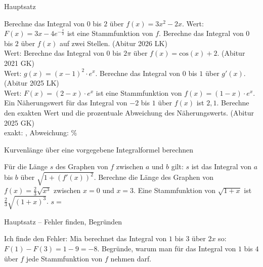 \setcounter{aufgabe}{9}

\begin{aufgabe}{Hauptsatz}
\begin{teile}
\teil Berechne das Integral von $0$ bis $2$ über $f(x) = 3x^2 - 2x$. Wert: \leerfeld
\teil $F(x) = 3x - 4e^{-\frac{x}{2}}$ ist eine Stammfunktion von $f$. Berechne das Integral von $0$ bis $2$ über $f(x)$ auf zwei Stellen. \hfill (Abitur 2026 LK) \\ Wert: \leerfeld
\teil Berechne das Integral von $0$ bis $2\pi$ über $f(x) = \mathrm{cos}(x) + 2$. \hfill (Abitur 2021 GK) \\ Wert: \leerfeld
\teil $g(x) = (x - 1)^2 \cdot e^{x}$. Berechne das Integral von $0$ bis $1$ über $g'(x)$. \hfill (Abitur 2025 LK) \\ Wert: \leerfeld
\teil $F(x) = (2 - x) \cdot e^{x}$ ist eine Stammfunktion von $f(x) = (1 - x) \cdot e^{x}$. Ein Näherungswert für das Integral von $-2$ bis $1$ über $f(x)$ ist $2{,}1$. Berechne den exakten Wert und die prozentuale Abweichung des Näherungswerts. \hfill (Abitur 2025 GK) \\ exakt: \leerfeld , Abweichung: \leerfeld \%
\end{teile}
\end{aufgabe}

\begin{aufgabe}{Kurvenlänge über eine vorgegebene Integralformel berechnen}
\begin{teile}
\teil Für die Länge $s$ des Graphen von $f$ zwischen $a$ und $b$ gilt: $s$ ist das Integral von $a$ bis $b$ über $\sqrt{1 + (f'(x))^2}$. Berechne die Länge des Graphen von $f(x) = \frac{2}{3}\sqrt{x^3}$ zwischen $x = 0$ und $x = 3$. Eine Stammfunktion von $\sqrt{1 + x}$ ist $\frac{2}{3}\sqrt{(1 + x)^3}$. $s = $ \leerfeld
\end{teile}
\end{aufgabe}

\begin{aufgabe}{Hauptsatz – Fehler finden, Begründen}
\begin{teile}
\teil Ich finde den Fehler: Mia berechnet das Integral von $1$ bis $3$ über $2x$ so: $F(1) - F(3) = 1 - 9 = -8$.
\teil Begründe, warum man für das Integral von $1$ bis $4$ über $f$ jede Stammfunktion von $f$ nehmen darf.
\end{teile}
\end{aufgabe}
